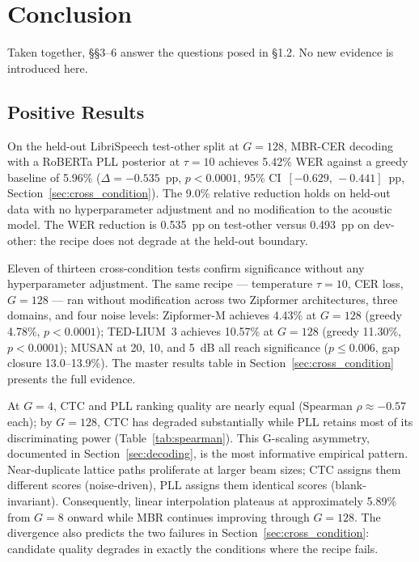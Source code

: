 \section{Conclusion}

Taken together, §§3–6 answer the questions posed in §1.2. No new evidence is introduced here.



\subsection{Positive Results}

On the held-out LibriSpeech test-other split at $G=128$, MBR-CER decoding with a RoBERTa PLL posterior at $\tau=10$ achieves 5.42\% WER against a greedy baseline of 5.96\% ($\Delta=-0.535$~pp, $p < 0.0001$, 95\% CI~$[-0.629,\,-0.441]$~pp, Section~\ref{sec:cross_condition}). The 9.0\% relative reduction holds on held-out data with no hyperparameter adjustment and no modification to the acoustic model. The WER reduction is 0.535~pp on test-other versus 0.493~pp on dev-other: the recipe does not degrade at the held-out boundary.

Eleven of thirteen cross-condition tests confirm significance without any hyperparameter adjustment. The same recipe — temperature $\tau=10$, CER loss, $G=128$ — ran without modification across two Zipformer architectures, three domains, and four noise levels: Zipformer-M achieves 4.43\% at $G=128$ (greedy 4.78\%, $p < 0.0001$); TED-LIUM~3 achieves 10.57\% at $G=128$ (greedy 11.30\%, $p < 0.0001$); MUSAN at 20, 10, and 5~dB all reach significance ($p \leq 0.006$, gap closure 13.0–13.9\%). The master results table in Section~\ref{sec:cross_condition} presents the full evidence.

At $G=4$, CTC and PLL ranking quality are nearly equal (Spearman $\rho \approx -0.57$ each); by $G=128$, CTC has degraded substantially while PLL retains most of its discriminating power (Table~\ref{tab:spearman}). This G-scaling asymmetry, documented in Section~\ref{sec:decoding}, is the most informative empirical pattern. Near-duplicate lattice paths proliferate at larger beam sizes; CTC assigns them different scores (noise-driven), PLL assigns them identical scores (blank-invariant). Consequently, linear interpolation plateaus at approximately 5.89\% from $G=8$ onward while MBR continues improving through $G=128$. The divergence also predicts the two failures in Section~\ref{sec:cross_condition}: candidate quality degrades in exactly the conditions where the recipe fails.

